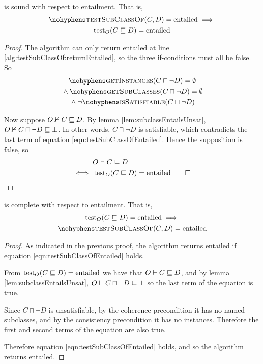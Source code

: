 \documentclass[paper.tex]{subfiles}
\begin{document}
\begin{proposition}
  \label{prop:testSubClassOfEntailedSound}
   is sound with respect to entailment.  That is,
  \begin{multline*}
    \textproc{testSubClassOf}(C, D) = \mathrm{entailed} \implies \\
    \test_O(C \sqsubseteq D) = \mathrm{entailed}
  \end{multline*}
\end{proposition}
\begin{proof}
  The algorithm can only return entailed at line \ref{alg:testSubClassOf:returnEntailed}, so the three if-conditions must all be false.  So
  \begin{multline}
    \label{eqn:testSubClassOfEntailed}
    \textproc{getInstances}(C \sqcap \neg D) = \emptyset \\
    {} \land \textproc{getSubClasses}(C \sqcap \neg D) = \emptyset \\
    {} \land \lnot \textproc{isSatisfiable}(C \sqcap \neg D)
  \end{multline}

  Now suppose $O \nvdash C \sqsubseteq D$.  By lemma \ref{lem:subclassEntailsUnsat}, $O \nvdash C \sqcap \neg D \sqsubseteq \bot$.  In other words, $C \sqcap \neg D$ is satisfiable, which contradicts the last term of equation \ref{eqn:testSubClassOfEntailed}.  Hence the supposition is false, so
  \begin{align*}
    & O \vdash C \sqsubseteq D \\
    \iff{}& \operatorname{test}_O(C \sqsubseteq D) = \mathrm{entailed}
    \qed
  \end{align*}
\end{proof}

\begin{proposition}
  \label{prop:testSubClassOfEntailedComplete}
   is complete with respect to entailment.  That is,
  \begin{multline*}
    \test_O(C \sqsubseteq D) = \mathrm{entailed} \implies \\
    \textproc{testSubClassOf}(C, D) = \mathrm{entailed}
  \end{multline*}
\end{proposition}
\begin{proof}
  As indicated in the previous proof, the algorithm returns entailed if equation \ref{eqn:testSubClassOfEntailed} holds.

  From $\operatorname{test}_O(C \sqsubseteq D) = \mathrm{entailed}$ we have that $O \vdash C \sqsubseteq D$, and by lemma \ref{lem:subclassEntailsUnsat}, $O \vdash C \sqcap \neg D \sqsubseteq \bot$ so the last term of the equation is true.

  Since $C \sqcap \neg D$ is unsatisfiable, by the coherence precondition it has no named subclasses, and by the consistency precondition it has no instances.  Therefore the first and second terms of the equation are also true.

  Therefore equation \ref{eqn:testSubClassOfEntailed} holds, and so the algorithm returns entailed.
\end{proof}
\end{document}
